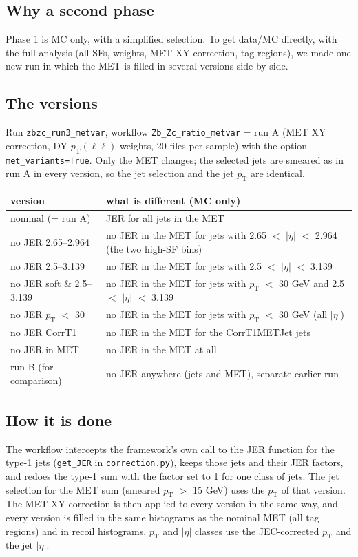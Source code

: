 \documentclass[11pt,a4paper]{article}
\newcommand{\pt}{$p_\mathrm{T}$}
\newcommand{\aeta}{$|\eta|$}
\begin{document}
\subsection{Why a second phase}
Phase 1 is MC only, with a simplified selection. To get data/MC directly, with the full analysis (all SFs, weights, MET XY
correction, tag regions), we made one new run in which the MET is filled in several versions side by side.

\subsection{The versions}
Run \texttt{zbzc\_run3\_metvar}, workflow \texttt{Zb\_Zc\_ratio\_metvar} = run A (MET XY correction, DY $p_\mathrm{T}(\ell\ell)$
weights, 20 files per sample) with the option \texttt{met\_variants=True}. Only the MET changes; the selected jets are smeared
as in run A in every version, so the jet selection and the jet \pt{} are identical.
\begin{center}
\small
\begin{tabular}{l l}
\toprule
version & what is different (MC only) \\
\midrule
nominal (= run A) & JER for all jets in the MET \\
no JER 2.65--2.964 & no JER in the MET for jets with 2.65 $<$ \aeta{} $<$ 2.964 (the two high-SF bins) \\
no JER 2.5--3.139 & no JER in the MET for jets with 2.5 $<$ \aeta{} $<$ 3.139 \\
no JER soft \& 2.5--3.139 & no JER in the MET for jets with \pt{} $<$ 30 GeV and 2.5 $<$ \aeta{} $<$ 3.139 \\
no JER \pt{} $<$ 30 & no JER in the MET for jets with \pt{} $<$ 30 GeV (all \aeta) \\
no JER CorrT1 & no JER in the MET for the CorrT1METJet jets \\
no JER in MET & no JER in the MET at all \\
run B (for comparison) & no JER anywhere (jets and MET), separate earlier run \\
\bottomrule
\end{tabular}
\end{center}

\subsection{How it is done}
The workflow intercepts the framework's own call to the JER function for the type-1 jets (\texttt{get\_JER} in
\texttt{correction.py}), keeps those jets and their JER factors, and redoes the type-1 sum with the factor set to 1 for one class
of jets. The jet selection for the MET sum (smeared \pt{} $>$ 15 GeV) uses the \pt{} of that version. The MET XY correction is
then applied to every version in the same way, and every version is filled in the same histograms as the nominal MET (all
tag regions) and in recoil histograms. \pt{} and \aeta{} classes use the JEC-corrected \pt{} and the jet \aeta.
\end{document}
